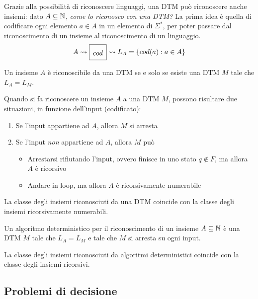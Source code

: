 Grazie alla possibilità di riconoscere linguaggi, una DTM può riconoscere anche insiemi: dato $A \subseteq \mathbb{N}$, \textit{come lo riconosco con una DTM?} La prima idea è quella di codificare ogni elemento $a \in A$ in un elemento di $\Sigma^\ast$, per poter passare dal riconoscimento di un insieme al riconoscimento di un linguaggio.
$$
\renewcommand{\arraystretch}{1.8}
A \rightsquigarrow \begin{array}{|c|}
	\hline
	cod \\
	\hline
\end{array}
\rightsquigarrow L_A = \{cod(a): a \in A\}
$$

Un insieme $A$ è riconoscibile da una DTM se e solo se esiste una DTM $M$ tale che $L_A = L_M$.

Quando si fa riconoscere un insieme $A$ a una DTM $M$, possono risultare due situazioni, in funzione dell'input (codificato):
\begin{enumerate}
	\item Se l'input appartiene ad $A$, allora $M$ si arresta
	
    \item Se l'input \textit{non} appartiene ad $A$, allora $M$ può 
	\begin{itemize}
		\item Arrestarsi rifiutando l'input, ovvero finisce in uno stato $q \notin F$, ma allora $A$ è ricorsivo
		
        \item Andare in loop, ma allora $A$ è ricorsivamente numerabile \\
	\end{itemize}
\end{enumerate}

\begin{theor}
	La classe degli insiemi riconosciuti da una DTM coincide con la classe degli insiemi ricorsivamente numerabili.
\end{theor}

Un algoritmo deterministico per il riconoscimento di un insieme $A \subseteq \mathbb{N}$ è una DTM $M$ tale che $L_A = L_M$ e tale che $M$ si arresta su ogni input. \\

\begin{theor}
	La classe degli insiemi riconosciuti da algoritmi deterministici coincide con la classe degli insiemi ricorsivi.
  \end{theor}

\subsection{Problemi di decisione}

